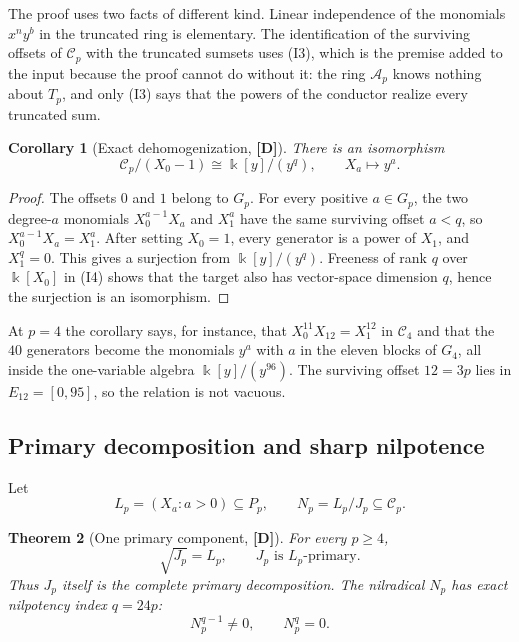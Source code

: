 \documentclass[11pt]{article}
\newtheorem{theorem}{Theorem}[section]
\newtheorem{corollary}[theorem]{Corollary}
\theoremstyle{definition}
\theoremstyle{remark}
\newcommand{\kfield}{\Bbbk}
\newcommand{\Cfiber}{\mathcal{C}}
\newcommand{\mD}{\textbf{[D]}}
\begin{document}
The proof uses two facts of different kind. Linear independence of the monomials $x^ny^b$ in the
truncated ring is elementary. The identification of the surviving offsets of $\Cfiber_p$ with
the truncated sumsets uses (I3), which is the premise added to the input because the proof
cannot do without it: the ring $\mathcal A_p$ knows nothing about $T_p$, and only (I3) says that
the powers of the conductor realize every truncated sum.

\begin{corollary}[Exact dehomogenization, \mD]\label{cor:dehom}
There is an isomorphism
\[
 \Cfiber_p/(X_0-1)\cong\kfield[y]/(y^q),
 \qquad X_a\longmapsto y^a.
\]
\end{corollary}

\begin{proof}
The offsets $0$ and $1$ belong to $G_p$. For every positive $a\in G_p$, the two degree-$a$
monomials $X_0^{a-1}X_a$ and $X_1^a$ have the same surviving offset $a<q$, so
$X_0^{a-1}X_a=X_1^a$. After setting $X_0=1$, every generator is a power of $X_1$, and
$X_1^q=0$. This gives a surjection from $\kfield[y]/(y^q)$. Freeness of rank $q$ over
$\kfield[X_0]$ in (I4) shows that the target also has vector-space dimension $q$, hence the
surjection is an isomorphism.
\end{proof}

At $p=4$ the corollary says, for instance, that $X_0^{11}X_{12}=X_1^{12}$ in $\Cfiber_4$ and that
the $40$ generators become the monomials $y^a$ with $a$ in the eleven blocks of $G_4$, all
inside the one-variable algebra $\kfield[y]/(y^{96})$. The surviving offset $12=3p$ lies in
$E_{12}=[0,95]$, so the relation is not vacuous.

\subsection{Primary decomposition and sharp nilpotence}

Let
\[
 L_p=(X_a:a>0)\subseteq P_p,
 \qquad N_p=L_p/J_p\subseteq\Cfiber_p.
\]

\begin{theorem}[One primary component, \mD]\label{thm:primary}
For every $p\geq4$,
\[
 \sqrt{J_p}=L_p,\qquad J_p\text{ is }L_p\text{-primary}.
\]
Thus $J_p$ itself is the complete primary decomposition. The nilradical $N_p$ has exact
nilpotency index $q=24p$:
\[
 N_p^{q-1}\neq0,\qquad N_p^q=0.
\]
\end{theorem}
\end{document}
